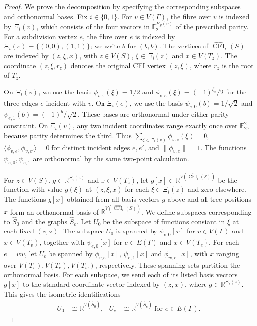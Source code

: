 \documentclass[11pt,a4paper]{article}
\theoremstyle{plain}
\theoremstyle{definition}
\DeclareMathOperator{\CFI}{CFI}
\newcommand{\R}{\mathbb{R}}
\begin{document}
\begin{proof}
We prove the decomposition by specifying the corresponding subspaces
and orthonormal bases.
Fix $i\in\{0,1\}$.
For $v\in V(\Gamma)$, the fibre over $v$ is indexed by $\Xi_i(v)$, which
consists of the four vectors in $\mathbb F_2^{E_S(v)}$ of the
prescribed parity.
For a subdivision vertex $e$, the fibre over $e$ is indexed by
$\Xi_i(e)=\{(0,0),(1,1)\}$; we write $b$ for $(b,b)$.
The vertices of $\widehat{\CFI}_i(S)$ are indexed by $(z,\xi,x)$, with $z\in V(S)$,
$\xi\in \Xi_i(z)$ and $x\in V(T_z)$.
The coordinate $(z,\xi,r_z)$ denotes the original CFI vertex $(z,\xi)$,
where $r_z$ is the root of $T_z$.

On $\Xi_i(v)$, we use the basis $\phi_{v,0}(\xi)=1/2$ and
$\phi_{v,e}(\xi)=(-1)^{\xi_e}/2$ for the three edges $e$ incident with $v$.
On $\Xi_i(e)$, we use the basis $\psi_{e,0}(b)=1/\sqrt2$ and
$\psi_{e,1}(b)=(-1)^b/\sqrt2$.
These bases are orthonormal under either parity constraint.
On $\Xi_i(v)$, any two incident coordinates range exactly once over
$\mathbb F_2^2$, because parity determines the third.
Thus $\sum_{\xi\in \Xi_i(v)}\phi_{v,e}(\xi)=0$,
$\langle\phi_{v,e},\phi_{v,e'}\rangle=0$ for distinct incident edges $e,e'$,
and $\lVert\phi_{v,e}\rVert=1$.
The functions $\psi_{e,0},\psi_{e,1}$ are orthonormal by the same two-point
calculation.

For $z\in V(S)$, $g\in\R^{\Xi_i(z)}$ and $x\in V(T_z)$,
let $g[x]\in\R^{V(\widehat{\CFI}_i(S))}$ be the function with value $g(\xi)$ at
$(z,\xi,x)$ for each $\xi\in \Xi_i(z)$ and zero elsewhere.
The functions $g[x]$ obtained from all basis vectors $g$ above and all
tree positions $x$ form an orthonormal basis of $\R^{V(\widehat{\CFI}_i(S))}$.
We define subspaces corresponding to $\widehat S_0$
and the graphs $\widehat S_e$.
Let $U_0$ be the subspace of functions constant in $\xi$ at each fixed $(z,x)$.
The subspace $U_0$ is spanned by $\phi_{v,0}[x]$ for $v\in V(\Gamma)$
and $x\in V(T_v)$, together with $\psi_{e,0}[x]$ for $e\in E(\Gamma)$
and $x\in V(T_e)$.
For each $e=vw$, let $U_e$ be spanned by $\phi_{v,e}[x]$, $\psi_{e,1}[x]$
and $\phi_{w,e}[x]$, with $x$ ranging over $V(T_v),V(T_e),V(T_w)$,
respectively.
These spanning sets partition the orthonormal basis.
For each subspace, we send each of its listed basis vectors $g[x]$ to the standard coordinate vector indexed
by $(z,x)$, where $g\in\R^{\Xi_i(z)}$.
This gives the isometric identifications
\begin{equation}\label{eq:ss-cfi-subspaces}
 \begin{aligned}
 U_0&\cong\R^{V(\widehat S_0)}, &
 U_e&\cong\R^{V(\widehat S_e)}\text{ for }e\in E(\Gamma).
 \end{aligned}
\end{equation}


\end{proof}
\end{document}
